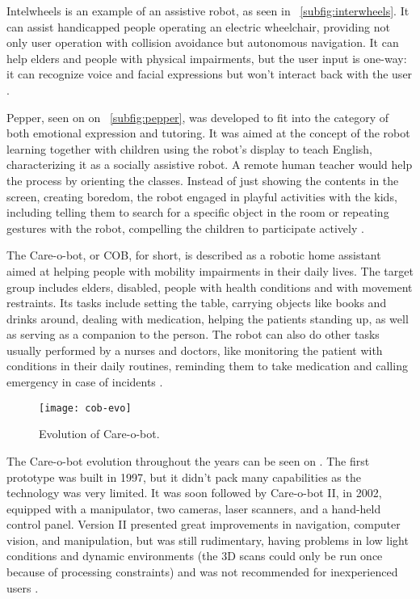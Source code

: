 Intelwheels is an example of an assistive robot, as seen in \figurename~\ref{subfig:interwheels}. It can assist handicapped people operating an electric wheelchair, providing not only user operation with collision avoidance but autonomous navigation. It can help elders and people with physical impairments, but the user input is one-way: it can recognize voice and facial expressions but won't interact back with the user \cite{braga2008intellwheels}.

Pepper, seen on on \figurename~\ref{subfig:pepper}, was developed to fit into the category of both emotional expression and tutoring. It was aimed at the concept of the robot learning together with children using the robot's display to teach English, characterizing it as a socially assistive robot. A remote human teacher would help the process by orienting the classes. Instead of just showing the contents in the screen, creating boredom, the robot engaged in playful activities with the kids, including telling them to search for a specific object in the room or repeating gestures with the robot, compelling the children to participate actively \cite{tanaka2015pepper}.

The Care-o-bot, or COB, for short, is described as a robotic home assistant aimed at helping people with mobility impairments in their daily lives. The target group includes elders, disabled, people with health conditions and with movement restraints. Its tasks include setting the table, carrying objects like books and drinks around, dealing with medication, helping the patients standing up, as well as serving as a companion to the person. The robot can also do other tasks usually performed by a nurses and doctors, like monitoring the patient with conditions in their daily routines, reminding them to take medication and calling emergency in case of incidents \cite{graf2004care}.

\begin{figure}[!ht]
    \centering
    \texttt{[image: cob-evo]}
    \caption{Evolution of Care-o-bot.}
    \label{fig:cob-evo}
\end{figure}

The Care-o-bot evolution throughout the years can be seen on . The first prototype was built in 1997, but it didn't pack many capabilities as the technology was very limited. It was soon followed by Care-o-bot II, in 2002, equipped with a manipulator, two cameras, laser scanners, and a hand-held control panel. Version II presented great improvements in navigation, computer vision, and manipulation, but was still rudimentary, having problems in low light conditions and dynamic environments (the 3D scans could only be run once because of processing constraints) and was not recommended for inexperienced users \cite{graf2004care}.

